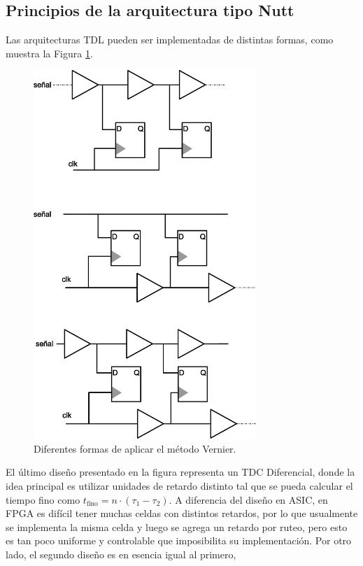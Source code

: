 \subsection{Principios de la arquitectura tipo Nutt}
Las arquitecturas TDL pueden ser implementadas de distintas formas, como muestra la Figura \ref{fig: various_tdl}.
\begin{figure}[H]
     \centering
     \includegraphics[width=0.75\textwidth]{imagenes/various_tdl.eps}
     \caption{Diferentes formas de aplicar el método Vernier.}
     \label{fig: various_tdl}
\end{figure}
El último diseño presentado en la figura representa un TDC Diferencial, donde la
idea principal es utilizar unidades de retardo distinto tal que se pueda calcular
el tiempo fino como $t_\text{fino} = n \cdot (\tau_1 - \tau_2)$. A diferencia 
del diseño en ASIC, en FPGA es difícil
tener muchas celdas con distintos retardos, por lo que usualmente se implementa la misma celda
y luego se agrega un retardo por ruteo, pero esto es tan poco uniforme y controlable que 
imposibilita su implementación. Por otro lado, el segundo diseño es en esencia igual al primero,

